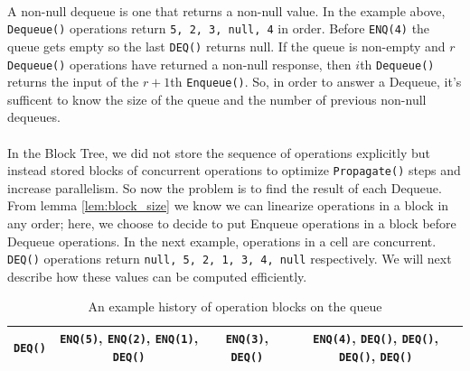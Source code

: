 \documentclass[10pt]{article}
\theoremstyle{definition}
\begin{document}
\pagebreak

\paragraph{}
A non-null dequeue is one that returns a non-null value. In the example above, \texttt{Dequeue()} operations return \texttt{5, 2, 3, null, 4} in order. Before \texttt{ENQ(4)} the queue gets empty so the last \texttt{DEQ()} returns null. If the queue is non-empty and $r$ \texttt{Dequeue()} operations have returned a non-null response, then $i$th \texttt{Dequeue()} returns the input of the $r+1$th \texttt{Enqueue()}. So, in order to answer a Dequeue, it's sufficent to know the size of the queue and the number of previous non-null dequeues.




\paragraph{}
In the Block Tree, we did not store the sequence of operations explicitly but instead stored blocks of concurrent operations to optimize \texttt{Propagate()} steps and increase parallelism. So now the problem is to find the result of each Dequeue. From lemma \ref{lem:block_size} we know we can linearize operations in a block in any order; here, we choose to decide to put Enqueue operations in a block before Dequeue operations. In the next example, operations in a cell are concurrent. \texttt{DEQ()} operations return \texttt{null, 5, 2, 1, 3, 4, null} respectively. We will next describe how these values can be computed efficiently.

\begin{table}[hbt]
\centering
  \begin{tabular}{c|c|c|c}
    \hline \texttt{DEQ()} & \texttt{ENQ(5)}, \texttt{ENQ(2)}, \texttt{ENQ(1)}, \texttt{DEQ()}& \texttt{ENQ(3)}, \texttt{DEQ()}&  \texttt{ENQ(4)}, \texttt{DEQ()}, \texttt{DEQ()}, \texttt{DEQ()}, \texttt{DEQ()}\\ \hline
  \end{tabular}
  \caption{An example history of operation blocks on the queue}
\end{table}
\end{document}
